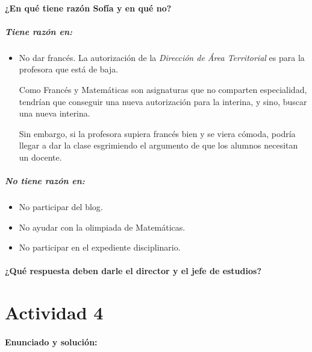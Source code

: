 \paragraph{¿En qué tiene razón Sofía y en qué no?}

\subparagraph{Tiene razón en:}

\begin{itemize}
	\item No dar francés.
 La autorización de la \textit{Dirección de Área Territorial} es para la profesora que está de baja.
 
	Como Francés y Matemáticas son asignaturas que no comparten especialidad, tendrían que conseguir una nueva autorización para la interina, y sino, buscar una nueva interina.


	Sin embargo, si la profesora supiera francés bien y se viera cómoda, podría llegar a dar la clase esgrimiendo el argumento de que los alumnos necesitan un docente.

\end{itemize}


\subparagraph{No tiene razón en:}

\begin{itemize}
	\item No participar del blog.

	\item No ayudar con la olimpiada de Matemáticas.

	\item No participar en el expediente disciplinario.

\end{itemize}


\paragraph{¿Qué respuesta deben darle el director y el jefe de estudios?}



\newpage
\section*{Actividad 4}
\paragraph{Enunciado y solución:}


